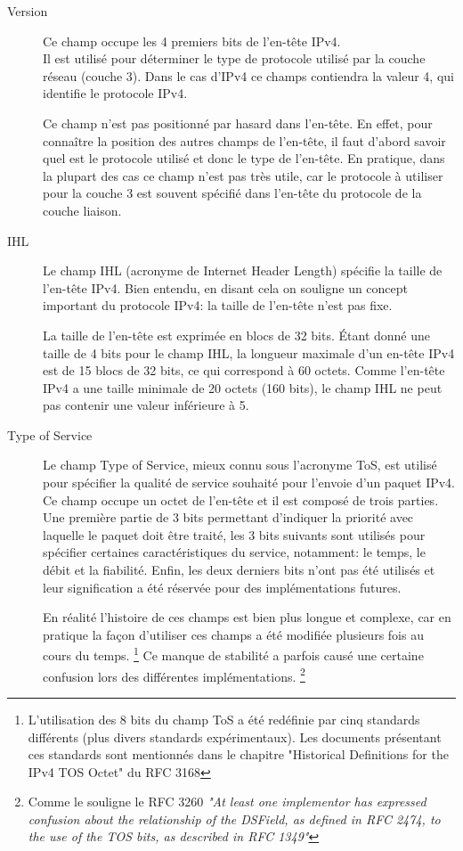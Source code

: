 \begin{description}
\item [Version] 
Ce champ occupe les 4 premiers bits de l'en-tête IPv4.\\
Il est utilisé pour déterminer le type de protocole utilisé par la couche
réseau (couche 3). Dans le cas d'IPv4 ce champs contiendra la valeur
4, qui identifie le protocole IPv4.

Ce champ n'est pas positionné par hasard dans l'en-tête. En effet, pour
connaître la position des autres champs de l'en-tête, il faut d'abord savoir
quel est le protocole utilisé et donc le type de l'en-tête.
En pratique, dans la plupart des cas ce champ n'est pas très utile, car le
protocole à utiliser pour la couche 3 est souvent spécifié dans l'en-tête du
protocole de la couche liaison.

\item [IHL]
Le champ IHL (acronyme de Internet Header Length) spécifie la taille de l'en-tête IPv4. 
Bien entendu, en disant cela on souligne un concept important du protocole IPv4: 
la taille de l'en-tête n'est pas fixe.

La taille de l'en-tête est exprimée en blocs de 32 bits. Étant donné une taille de
4 bits pour le champ IHL, la longueur maximale d'un en-tête IPv4 est de 15 blocs de
32 bits, ce qui correspond à 60 octets. Comme l'en-tête IPv4 a une taille minimale
de 20 octets (160 bits), le champ IHL ne peut pas contenir une valeur inférieure à 5.

\item [Type of Service]
Le champ Type of Service, mieux connu sous l'acronyme ToS, est utilisé pour 
spécifier la qualité de service souhaité pour l'envoie d'un paquet IPv4.
Ce champ occupe un octet de l'en-tête et il est composé de trois parties.
Une première partie de 3 bits permettant d'indiquer la priorité avec laquelle
le paquet doit être traité, les 3 bits suivants sont utilisés pour spécifier 
certaines caractéristiques du service, notamment: le temps, le débit et la fiabilité.
Enfin, les deux derniers bits n'ont pas été utilisés et leur signification a été 
réservée pour des implémentations futures.

En réalité l'histoire de ces champs est bien plus longue et complexe,
car en pratique la façon d'utiliser ces champs a été modifiée plusieurs fois au 
cours du temps.
\footnote{L'utilisation des 8 bits du champ ToS a été redéfinie
par cinq standards différents (plus divers standards expérimentaux).
Les documents présentant ces standards sont mentionnés dans le chapitre 
"Historical Definitions for the IPv4 TOS Octet" du RFC 3168}
Ce manque de stabilité a parfois causé une certaine confusion lors des différentes implémentations.
\footnote{Comme le souligne le RFC 3260 {\it "At least one implementor has expressed confusion about the
relationship of the DSField, as defined in RFC 2474, to the use of
the TOS bits, as described in RFC 1349"}}


\end{description}
